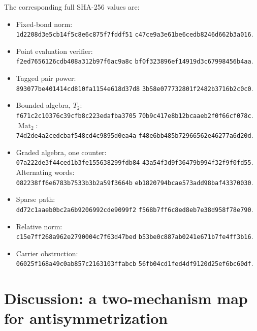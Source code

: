 \documentclass[11pt]{article}
\theoremstyle{definition}
\newcommand{\Mat}{\operatorname{Mat}}
\begin{document}
The corresponding full SHA-256 values are:
\begin{itemize}
\item Fixed-bond norm:\\
\texttt{1d2208d3e5cb14f5c8e6c875f7fddf51}\allowbreak
\texttt{c47ce9a3e61be6cedb8246d662b3a016}.
\item Point evaluation verifier:\\
\texttt{f2ed7656126cdb408a312b97f6ac9a8c}\allowbreak
\texttt{bf0f323896ef14919d3c67998456b4aa}.
\item Tagged pair power:\\
\texttt{893077be401414cd810fa1154e618d37d8}\allowbreak
\texttt{3b58e077732801f2482b3716b2c0c0}.
\item Bounded algebra, $T_2$:\\
\texttt{f671c2c10376c39cfb8c223edafba3705}\allowbreak
\texttt{70b9c417e8b12bcaaeb2f0f66cf078c}.\\
$\Mat_2$:\\
\texttt{74d2de4a2cedcbaf548cd4c9895d0ea4a}\allowbreak
\texttt{f48e6bb485b72966562e46277a6d20d}.
\item Graded algebra, one counter:\\
\texttt{07a222de3f44ced1b3fe155638299fdb84}\allowbreak
\texttt{43a54f3d9f36479b994f32f9f0fd55}.\\
Alternating words:\\
\texttt{082238ff6e6783b7533b3b2a59f3664b}\allowbreak
\texttt{eb1820794bcae573add98baf43370030}.
\item Sparse path:\\
\texttt{dd72c1aaeb0bc2a6b9206992cde9099f2}\allowbreak
\texttt{f568b7ff6c8ed8eb7e38d958f78e790}.
\item Relative norm:\\
\texttt{c15e7ff268a962e2790004c7f63d47bed}\allowbreak
\texttt{b53be0c887ab0241e671b7fe4ff3b16}.
\item Carrier obstruction:\\
\texttt{06025f168a49c0ab857c2163103ffabcb}\allowbreak
\texttt{56fb04cd1fed4df9120d25ef6bc60df}.
\end{itemize}

\section{Discussion: a two-mechanism map for antisymmetrization}
\label{sec:two-mechanism-map}
\end{document}
